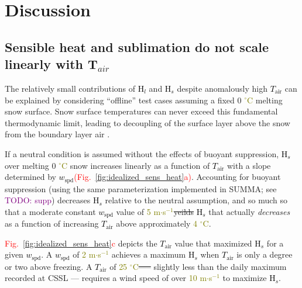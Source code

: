 \documentclass[draft]{agujournal2019}
\newcommand{\fig}[2]{\textcolor{red}{(Fig.~\ref{#1}{#2})}}   %
\newcommand{\fignop}[2]{\textcolor{red}{Fig.~\ref{#1}{#2}}}  %
\newcommand{\todo}[1]{\textcolor{purple}{TODO: #1}}      %
\newcommand{\mynum}[1]{\textcolor{olive}{#1}}
\newcommand{\tair}{\textcolor{black}{$T_{\mathrm{air}}$}\xspace}
\newcommand{\wspd}{\textcolor{black}{$w_{\mathrm{spd}}$}\xspace}
\newcommand{\hs}{\textcolor{black}{H$_s$}\xspace}
\newcommand{\hlat}{\textcolor{black}{H$_l$}\xspace}
\newcommand{\ms}{\textcolor{olive}{m$\cdot$s$^{-1}$}\xspace}
\newcommand{\degrc}{\textcolor{olive}{$^\circ$C}\xspace}
\providecommand{\DIFadd}[1]{{\protect\color{blue}\uwave{#1}}} %
\providecommand{\DIFdel}[1]{{\protect\color{red}\sout{#1}}}                      %
\providecommand{\DIFaddbegin}{} %
\providecommand{\DIFaddend}{} %
\providecommand{\DIFdelbegin}{} %
\providecommand{\DIFdelend}{} %
\begin{document}
\section{Discussion}
\subsection{Sensible heat and sublimation do not scale linearly with T$_{air}$}
The relatively small contributions of \hlat and \hs despite anomalously high \tair can be explained by considering ``offline'' test cases assuming a fixed 0 \degrc melting snow surface.
Snow surface temperatures can never exceed this fundamental thermodynamic limit, leading to decoupling of the surface layer above the snow from the boundary layer air \cite{Mott2013-jt}.

If a neutral condition is assumed without the effects of buoyant suppression, \hs over melting 0 \degrc snow increases linearly as a function of \tair with a slope determined by \wspd \fig{fig:idealized_sens_heat}{a}.
Accounting for buoyant suppression (using the same parameterization implemented in SUMMA; see \todo{supp}) decreases \hs relative to the neutral assumption, and so much so that a moderate constant \wspd value of \mynum{5} \ms \DIFdelbegin \DIFdel{yeilds }\DIFdelend \DIFaddbegin \DIFadd{yields }\DIFaddend \hs that actually \textit{decreases} as a function of increasing \tair above approximately \mynum{4} \degrc.

\fignop{fig:idealized_sens_heat}{c} depicts the \tair value that maximized \hs for a given \wspd.
A \wspd of \mynum{2} \ms achieves a maximum \hs when \tair is only a degree or two above freezing.
A \tair of \mynum{25} \degrc \DIFdelbegin \DIFdel{—-- }\DIFdelend \DIFaddbegin \DIFadd{--- }\DIFaddend slightly less than the daily maximum recorded at CSSL --- requires a wind speed of over \mynum{10} \ms to maximize \hs.
\end{document}
